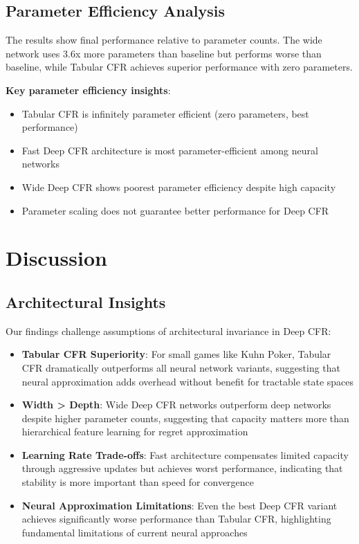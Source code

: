 \documentclass{article}
\begin{document}
\subsection{Parameter Efficiency Analysis}

The results show final performance relative to parameter counts. The wide network uses 3.6x more parameters than baseline but performs worse than baseline, while Tabular CFR achieves superior performance with zero parameters.

\textbf{Key parameter efficiency insights}:
\begin{itemize}
\item Tabular CFR is infinitely parameter efficient (zero parameters, best performance)
\item Fast Deep CFR architecture is most parameter-efficient among neural networks
\item Wide Deep CFR shows poorest parameter efficiency despite high capacity
\item Parameter scaling does not guarantee better performance for Deep CFR
\end{itemize}

\section{Discussion}

\subsection{Architectural Insights}

Our findings challenge assumptions of architectural invariance in Deep CFR:

\begin{itemize}
\item \textbf{Tabular CFR Superiority}: For small games like Kuhn Poker, Tabular CFR dramatically outperforms all neural network variants, suggesting that neural approximation adds overhead without benefit for tractable state spaces
\item \textbf{Width > Depth}: Wide Deep CFR networks outperform deep networks despite higher parameter counts, suggesting that capacity matters more than hierarchical feature learning for regret approximation
\item \textbf{Learning Rate Trade-offs}: Fast architecture compensates limited capacity through aggressive updates but achieves worst performance, indicating that stability is more important than speed for convergence
\item \textbf{Neural Approximation Limitations}: Even the best Deep CFR variant achieves significantly worse performance than Tabular CFR, highlighting fundamental limitations of current neural approaches
\end{itemize}
\end{document}
